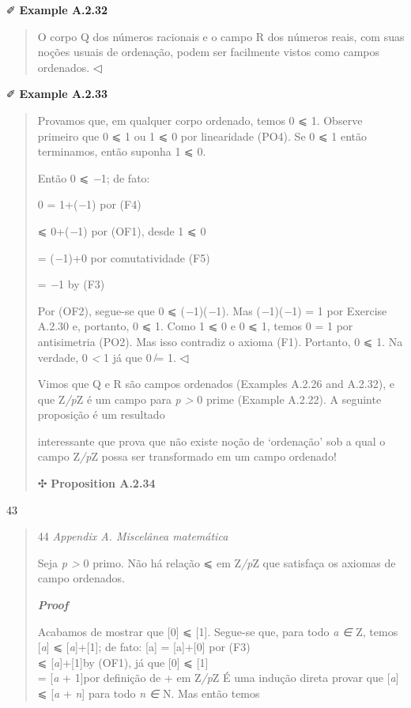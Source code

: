 \documentclass[
]{article}
\begin{document}
✐ \textbf{Example A.2.32}

\begin{quote}
O corpo Q dos números racionais e o campo R dos números reais, com suas
noções usuais de ordenação, podem ser facilmente vistos como campos
ordenados. ◁
\end{quote}

✐ \textbf{Example A.2.33}

\begin{quote}
Provamos que, em qualquer corpo ordenado, temos 0 ⩽ 1. Observe primeiro
que 0 ⩽ 1 ou 1 ⩽ 0 por linearidade (PO4). Se 0 ⩽ 1 então terminamos,
então suponha 1 ⩽ 0.

Então 0 ⩽ \emph{−}1; de fato:

0 = 1+(\emph{−}1) por (F4)

⩽ 0+(\emph{−}1) por (OF1), desde 1 ⩽ 0

= (\emph{−}1)+0 por comutatividade (F5)

= \emph{−}1 by (F3)

Por (OF2), segue-se que 0 ⩽ (\emph{−}1)(\emph{−}1). Mas
(\emph{−}1)(\emph{−}1) = 1 por Exercise A.2.30 e, portanto, 0 ⩽ 1. Como
1 ⩽ 0 e 0 ⩽ 1, temos 0 = 1 por antisimetria (PO2). Mas isso contradiz o
axioma (F1). Portanto, 0 ⩽ 1. Na verdade, 0 \emph{\textless{}} 1 já que
0 \emph{̸}= 1. ◁

Vimos que Q e R são campos ordenados (Examples A.2.26 and A.2.32), e que
Z\emph{/p}Z é um campo para \emph{p \textgreater{}} 0 prime (Example
A.2.22). A seguinte proposição é um resultado

interessante que prova que não existe noção de `ordenação' sob a qual o
campo Z\emph{/p}Z possa ser transformado em um campo ordenado!

✣ \textbf{Proposition A.2.34}
\end{quote}

43

\begin{quote}
44 \emph{Appendix A. Miscelânea matemática}

Seja \emph{p \textgreater{}} 0 primo. Não há relação ⩽ em Z\emph{/p}Z
que satisfaça os axiomas de campo ordenados.

\emph{\textbf{Proof}}

Acabamos de mostrar que {[}0{]} ⩽ {[}1{]}. Segue-se que, para todo
\emph{a ∈} Z, temos {[}\emph{a}{]} ⩽ {[}\emph{a}{]}+{[}1{]}; de fato:
{[}a{]} = {[}a{]}+{[}0{]} por (F3)\\
⩽ {[}\emph{a}{]}+{[}1{]}by (OF1), já que {[}0{]} ⩽ {[}1{]}\\
= {[}\emph{a} + 1{]}por definição de + em Z\emph{/p}Z É uma indução
direta provar que {[}\emph{a}{]} ⩽ {[}\emph{a} + \emph{n}{]} para todo
\emph{n ∈} N. Mas então temos
\end{quote}
\end{document}
